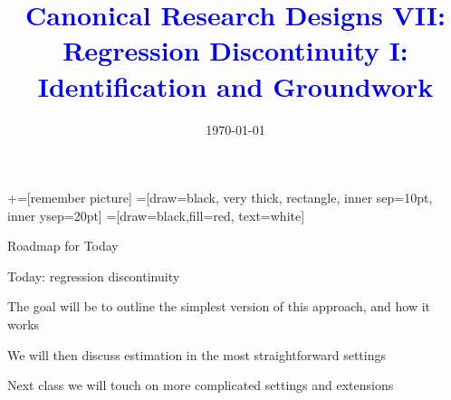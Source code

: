 \documentclass[notes,11pt, aspectratio=169]{beamer}
\title[]{\textcolor{blue}{Canonical Research Designs VII:\\ Regression
    Discontinuity I:\\ Identification and Groundwork}} \author[PGP]{}
\institute[FRBNY]{\small{\begin{tabular}{c}
                           Paul Goldsmith-Pinkham  \\
\end{tabular}}}
\date{\today}
\newenvironment{wideitemize}{\itemize\addtolength{\itemsep}{10pt}}{\enditemize}
\begin{document}
\newcommand\marktopleft[1]{%
    \tikz[overlay,remember picture] 
        \node (marker-#1-a) at (-.3em,.3em) {};%
}
\newcommand\markbottomright[2]{%
    \tikz[overlay,remember picture] 
        \node (marker-#1-b) at (0em,0em) {};%
}
+=[remember picture] 
 =[draw=black, very thick, rectangle, inner sep=10pt, inner ysep=20pt]
 =[draw=black,fill=red, text=white]

\begin{frame}
\maketitle
\end{frame}

\begin{frame}{Roadmap for Today}
  \begin{wideitemize}
  \item Today: regression discontinuity
  \item The goal will be to outline the simplest version of this
    approach, and how it works
  \item We will then discuss estimation in the most straightforward
    settings
  \item Next class we will touch on more complicated settings and
    extensions
  \end{wideitemize}
\end{frame}
\end{document}
